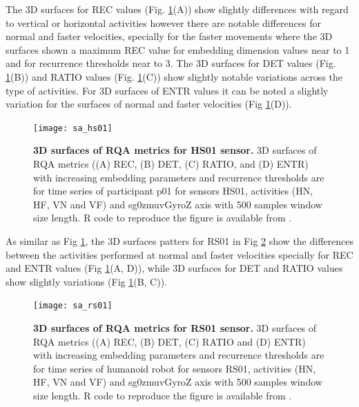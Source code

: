 The 3D surfaces for REC values (Fig. \ref{fig:topo_sa_hs01}(A))
show slightly differences with regard to vertical or horizontal activities
however there are notable differences for normal and faster velocities, 
specially for the faster movements where the 3D surfaces shown a maximum
REC value for embedding dimension values near to 1 and for recurrence 
thresholds near to 3. 
The 3D surfaces for DET values  
(Fig. \ref{fig:topo_sa_hs01}(B)) and RATIO values 
(Fig. \ref{fig:topo_sa_hs01}(C)) show slightly notable variations across 
the type of activities. 
For 3D surfaces of ENTR values it can be noted a slightly variation for
the surfaces of normal and faster velocities (Fig \ref{fig:topo_sa_hs01}(D)).
\begin{figure}[!ht]
\centering
\texttt{[image: sa\_hs01]}
    \caption{
	{\bf 3D surfaces of RQA metrics for HS01 sensor.}
	3D surfaces of RQA metrics ((A) REC, (B) DET, (C) RATIO, and (D) ENTR) 
	with increasing embedding parameters and recurrence thresholds 
	are for time series of participant p01 for 
	sensors HS01, activities (HN, HF, VN and VF) and 
	sg0zmuvGyroZ axis with 500 samples window size length. 
	R code to reproduce the figure is available from \cite{hwum2018}.
       }
\label{fig:topo_sa_hs01}
\end{figure}

As similar as Fig \ref{fig:topo_sa_hs01}, the 3D surfaces patters 
for RS01 in Fig \ref{fig:topo_sa_rs01} show the differences between 
the activities performed at normal and faster velocities
specially for REC and ENTR values (Fig \ref{fig:topo_sa_hs01}(A, D)),
while 3D surfaces for DET and RATIO values show slightly variations
(Fig \ref{fig:topo_sa_hs01}(B, C)).
\begin{figure}[!ht]
\centering
\texttt{[image: sa\_rs01]}
    \caption{
	{\bf 3D surfaces of RQA metrics for RS01 sensor.}
	3D surfaces of RQA metrics ((A) REC, (B) DET, (C) RATIO and (D) ENTR) 
	with increasing embedding parameters and recurrence thresholds 
	are for time series of humanoid robot for 
	sensors RS01, activities (HN, HF, VN and VF) and 
	sg0zmuvGyroZ axis with 500 samples window size length. 
	R code to reproduce the figure is available from \cite{hwum2018}.
       }
\label{fig:topo_sa_rs01}
\end{figure}


